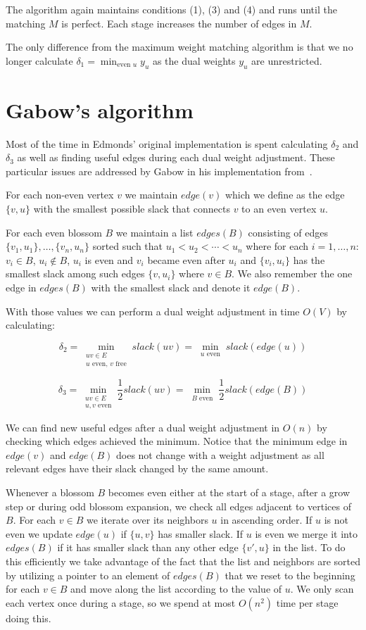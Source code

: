 The algorithm again maintains conditions (1), (3) and (4) and runs until the matching $M$ is perfect. Each stage increases the number of edges in $M$.

The only difference from the maximum weight matching algorithm is that we no longer calculate $\delta_1 = \min_{\text{even } u} y_u$ as the dual weights $y_u$ are unrestricted. 

\section{Gabow's algorithm}

Most of the time in Edmonds' original implementation is spent calculating $\delta_2$ and $\delta_3$ as well as finding useful edges during each dual weight adjustment. These particular issues are addressed by Gabow in his implementation from~\cite{gabow1974implementation}.

For each non-even vertex $v$ we maintain $edge(v)$ which we define as the edge $\{v, u\}$ with the smallest possible slack that connects $v$ to an even vertex $u$.

For each even blossom $B$ we maintain a list $edges(B)$ consisting of edges $\{v_1, u_1\}, \dots, \{v_n, u_n\}$ sorted such that $u_1 < u_2 < \cdots < u_n$ where for each $i = 1, \dots, n$: $v_i \in B$, $u_i \notin B$, $u_i$ is even and $v_i$ became even after $u_i$ and $\{v_i, u_i\}$ has the smallest slack among such edges $\{v, u_i\}$ where $v \in B$. We also remember the one edge in $edges(B)$ with the smallest slack and denote it $edge(B)$.

With those values we can perform a dual weight adjustment in time $O(V)$ by calculating:

\[\delta_2=\min_{\substack{uv\in E \\ \text{$u$ even, $v$ free}}} slack(uv) = \min_{\substack{u \text{ even}}} slack(edge(u))\] 

\[\delta_3=\min_{\substack{uv\in E \\ \text{$u, v$ even}}} \frac{1}{2}slack(uv) = \min_{\substack{B \text{ even}}} \frac{1}{2}slack(edge(B))\] 

We can find new useful edges after a dual weight adjustment in $O(n)$ by checking which edges achieved the minimum. Notice that the minimum edge in $edge(v)$ and $edge(B)$ does not change with a weight adjustment as all relevant edges have their slack changed by the same amount.

Whenever a blossom $B$ becomes even either at the start of a stage, after a grow step or during odd blossom expansion, we check all edges adjacent to vertices of $B$. For each $v \in B$ we iterate over its neighbors $u$ in ascending order. If $u$ is not even we update $edge(u)$ if $\{u, v\}$ has smaller slack. If $u$ is even we merge it into $edges(B)$ if it has smaller slack than any other edge $\{v', u\}$ in the list. To do this efficiently we take advantage of the fact that the list and neighbors are sorted by utilizing a pointer to an element of $edges(B)$ that we reset to the beginning for each $v \in B$ and move along the list according to the value of $u$. We only scan each vertex once during a stage, so we spend at most $O(n^2)$ time per stage doing this.

